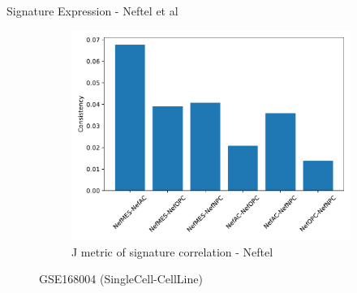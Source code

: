 \documentclass[aspectratio=169,9pt]{beamer}
\begin{document}
\begin{frame}{Signature Expression - Neftel et al}
\begin{adjustwidth}{-5cm}{-5cm}
\begin{figure}
\begin{subfigure}[c]{0.4\textwidth}
                    \includegraphics[width=\textwidth]{celllines_Consistency_Nef}
                    \caption{J metric of signature correlation - Neftel}
                \end{subfigure}
                \caption{GSE168004 (SingleCell-CellLine)}
            \end{figure}
        \end{adjustwidth}
    \end{frame}
\end{document}
